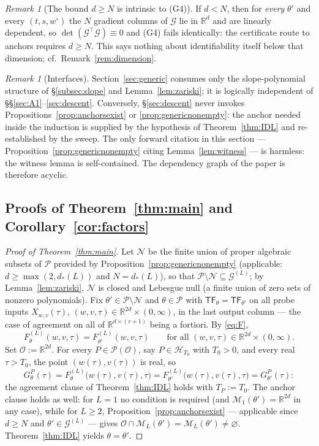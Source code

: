 \documentclass[11pt]{article}
\theoremstyle{definition}
\theoremstyle{remark}
\newtheorem{remark}[theorem]{Remark}
\theoremstyle{plain}
\newcommand{\R}{\mathbb{R}}
\newcommand{\cO}{\mathcal{O}}
\newcommand{\cP}{\mathcal{P}}
\newcommand{\cM}{\mathcal{M}}
\newcommand{\cG}{\mathcal{G}}
\newcommand{\cN}{\mathcal{N}}
\newcommand{\cH}{\mathcal{H}}
\newcommand{\TF}{\mathsf{TF}}
\begin{document}
\begin{remark}[The bound $d\ge N$ is intrinsic to (G4)]\label{rem:dlessN}
If $d<N$, then for \emph{every} $\theta'$ and every $(t,s,w^\circ)$ the $N$ gradient
columns of $\mathcal G$ lie in $\R^d$ and are linearly dependent, so
$\det(\mathcal G^\top\mathcal G)\equiv0$ and (G4) fails identically: the certificate
route to anchors requires $d\ge N$.  This says nothing about identifiability itself
below that dimension; cf.\ Remark~\ref{rem:dimension}.
\end{remark}

\begin{remark}[Interfaces]\label{rem:interfaces}
Section~\ref{sec:generic} consumes only the slope-polynomial structure of
\S\ref{subsec:slope} and Lemma~\ref{lem:zariski}; it is logically independent of
\S\S\ref{sec:A1}--\ref{sec:descent}.  Conversely, \S\ref{sec:descent} never invokes
Propositions~\ref{prop:anchorsexist} or \ref{prop:genericnonempty}: the anchor needed
inside the induction is supplied by the hypothesis of Theorem~\ref{thm:IDL} and
re-established by the sweep.  The only forward citation in this section ---
Proposition~\ref{prop:genericnonempty} citing Lemma~\ref{lem:witness} --- is harmless:
the witness lemma is self-contained.  The dependency graph of the paper is therefore
acyclic.
\end{remark}

\subsection{Proofs of Theorem~\ref{thm:main} and Corollary~\ref{cor:factors}}
\label{subsec:wrapup}

\begin{proof}[Proof of Theorem~\ref{thm:main}]
Let $\cN$ be the finite union of proper algebraic subsets of $\cP$ provided by
Proposition~\ref{prop:genericnonempty} (applicable: $d\ge\max(2,d_*(L))$ and
$N=d_*(L)$), so that $\cP\setminus\cN\subseteq\cG^{(L)}$; by
Lemma~\ref{lem:zariski}, $\cN$ is closed and Lebesgue null (a finite union of zero
sets of nonzero polynomials).  Fix $\theta'\in\cP\setminus\cN$ and $\theta\in\cP$ with
$\TF_\theta=\TF_{\theta'}$ on all probe inputs $X_{w,v}(\tau)$,
$(w,v,\tau)\in\R^{2d}\times(0,\infty)$, in the last output column --- the case of
agreement on all of $\R^{d\times(r+1)}$ being a fortiori.  By \eqref{eq:F},
\[
F^{(L)}_\theta(w,v,\tau)=F^{(L)}_{\theta'}(w,v,\tau)
\qquad\text{for all }(w,v,\tau)\in\R^{2d}\times(0,\infty).
\]
Set $\cO:=\R^{2d}$.  For every $P\in\cP(\cO)$, say $P\in\cH_{T_0}$ with $T_0>0$, and
every real $\tau>T_0$, the point $(w(\tau),v(\tau))$ is real, so
\[
G^P_\theta(\tau)=F^{(L)}_\theta\big(w(\tau),v(\tau),\tau\big)
=F^{(L)}_{\theta'}\big(w(\tau),v(\tau),\tau\big)=G^P_{\theta'}(\tau):
\]
the agreement clause of Theorem~\ref{thm:IDL} holds with $T_P:=T_0$.  The anchor
clause holds as well: for $L=1$ no condition is required (and
$\cM_1(\theta')=\R^{2d}$ in any case), while for $L\ge2$,
Proposition~\ref{prop:anchorsexist} --- applicable since $d\ge N$ and
$\theta'\in\cG^{(L)}$ --- gives
$\cO\cap\cM_L(\theta')=\cM_L(\theta')\neq\varnothing$.  Theorem~\ref{thm:IDL} yields
$\theta=\theta'$.
\end{proof}
\end{document}
